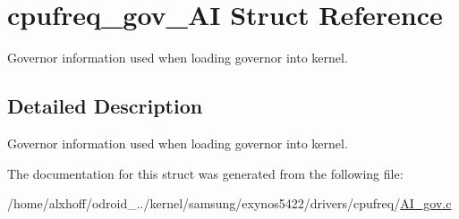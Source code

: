 \hypertarget{structcpufreq__gov__AI}{}\section{cpufreq\+\_\+gov\+\_\+\+AI Struct Reference}
\label{structcpufreq__gov__AI}


Governor information used when loading governor into kernel.  




\subsection{Detailed Description}
Governor information used when loading governor into kernel. 

The documentation for this struct was generated from the following file\+:\begin{DoxyCompactItemize}
\item 
/home/alxhoff/odroid\+\_../kernel/samsung/exynos5422/drivers/cpufreq/\hyperlink{AI__gov_8c}{A\+I\+\_\+gov.\+c}\end{DoxyCompactItemize}
